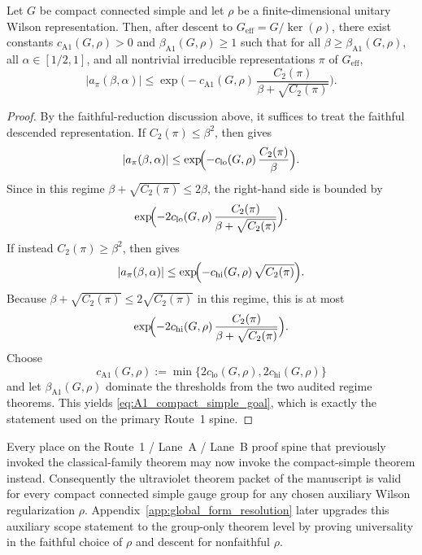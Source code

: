 \begin{theorem}\label{thm:A1_compact_simple_internal}
Let $G$ be compact connected simple and let $\rho$ be a finite-dimensional unitary Wilson representation.
Then, after descent to $G_{\mathrm{eff}}=G/\ker(\rho)$, there exist constants $c_{\mathrm{A1}}(G,\rho)>0$ and $\beta_{\mathrm{A1}}(G,\rho)\ge 1$ such that for all $\beta\ge \beta_{\mathrm{A1}}(G,\rho)$, all $\alpha\in[1/2,1]$, and all nontrivial irreducible representations $\pi$ of $G_{\mathrm{eff}}$,
\begin{equation}\label{eq:A1_compact_simple_goal}
|a_\pi(\beta,\alpha)|
\le
\exp\!\Big(-c_{\mathrm{A1}}(G,\rho)\,\frac{C_2(\pi)}{\beta+\sqrt{C_2(\pi)}}\Big).
\end{equation}
\end{theorem}

\begin{proof}
By the faithful-reduction discussion above, it suffices to treat the faithful descended representation.
If $C_2(\pi)\le \beta^2$, then  gives
\[
|a_\pi(\beta,\alpha)|
\le
\exp\!\Bigl(-c_{\mathrm{lo}}(G,\rho)\,\frac{C_2(\pi)}{\beta}\Bigr).
\]
Since in this regime $\beta+\sqrt{C_2(\pi)}\le 2\beta$, the right-hand side is bounded by
\[
\exp\!\Bigl(-2c_{\mathrm{lo}}(G,\rho)\,\frac{C_2(\pi)}{\beta+\sqrt{C_2(\pi)}}\Bigr).
\]
If instead $C_2(\pi)\ge \beta^2$, then  gives
\[
|a_\pi(\beta,\alpha)|
\le
\exp\!\Bigl(-c_{\mathrm{hi}}(G,\rho)\,\sqrt{C_2(\pi)}\Bigr).
\]
Because $\beta+\sqrt{C_2(\pi)}\le 2\sqrt{C_2(\pi)}$ in this regime, this is at most
\[
\exp\!\Bigl(-2c_{\mathrm{hi}}(G,\rho)\,\frac{C_2(\pi)}{\beta+\sqrt{C_2(\pi)}}\Bigr).
\]
Choose
\[
c_{\mathrm{A1}}(G,\rho):=\min\{2c_{\mathrm{lo}}(G,\rho),2c_{\mathrm{hi}}(G,\rho)\}
\]
and let $\beta_{\mathrm{A1}}(G,\rho)$ dominate the thresholds from the two audited regime theorems.
This yields \eqref{eq:A1_compact_simple_goal}, which is exactly the statement used on the primary Route~1 spine.
\end{proof}

\begin{corollary}\label{cor:A1_compact_simple_spine}
Every place on the Route~1 / Lane~A / Lane~B proof spine that previously invoked the classical-family theorem  may now invoke the compact-simple theorem  instead.
Consequently the ultraviolet theorem packet of the manuscript is valid for every compact connected simple gauge group for any chosen auxiliary Wilson regularization $\rho$.
Appendix~\ref{app:global_form_resolution} later upgrades this auxiliary scope statement to the group-only theorem level by proving universality in the faithful choice of $\rho$ and descent for nonfaithful $\rho$.
\end{corollary}


